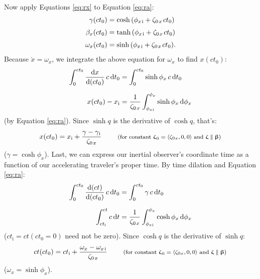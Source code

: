 \documentclass[12pt]{article}
\newcommand{\dd}[1]{\mathrm{d}#1}
\newcommand{\vvbeta}{\bm{\upbeta}}
\newcommand{\vvzeta}{\bm{\upzeta}}
\begin{document}
Now apply Equations \ref{eq:rx} to Equation \ref{eq:ra}:
\begin{equation*}
\begin{aligned}
\gamma (ct_0) &= \cosh{\left( \phi_{x \mkern2mu \textrm{i} } + \zeta_{0 \mkern2mu x} \mkern2mu ct_0 \right)} \\[3pt]
\beta_x (ct_0) &= \tanh{\left( \phi_{x \mkern2mu \textrm{i} } + \zeta_{0 \mkern2mu x} \mkern2mu ct_0 \right)} \\[3pt]
\omega_x (ct_0) &= \sinh{\left( \phi_{x \mkern2mu \textrm{i} } + \zeta_{0 \mkern2mu x} \mkern2mu ct_0 \right)} .
\end{aligned}
\end{equation*}
Because $\mathring{x} = \omega_x$, we integrate the above equation for $\omega_x$ to find $x(ct_0)$:
\begin{equation*}
\begin{split}
\int^{ct_0}_0 \dfrac{\dd x}{\dd (c t_0)} \, c \, \dd t_0 &= \int^{ct_0}_0 \sinh{\phi_x} \, c \, \dd t_0 \\[6pt]
x(ct_0) - x_{\mathrm{i}} &= \dfrac{1}{\zeta_{0 \mkern2mu x}} \int^{\phi_x}_{\phi_{x \mkern1mu \textrm{i} }} \sinh{\phi_x} \, \dd \phi_x
\end{split}
\end{equation*}
(by Equation \ref{eq:ra}). Since $\sinh{q}$ is the derivative of $\cosh{q}$, that's:
\begin{equation}\label{eq:x2}
x(ct_0) = x_{\mathrm{i}} + \dfrac{\gamma - \gamma_{\mkern1mu \mathrm{i}}}{ \zeta_{0 \mkern2mu x}} \qquad \textrm{\footnotesize{ (for constant $\vvzeta_{\mkern1mu 0} = \langle \zeta_{0 \mkern1mu x} , 0, 0 \rangle$ and $\vvzeta \parallel \vvbeta$)}}
\end{equation}
($\gamma = \cosh{\phi_x}$). Last, we can express our inertial observer's coordinate time as a function of our accelerating traveler's proper time. By time dilation and Equation \ref{eq:ra}:
\begin{equation*}
\begin{split}
\int^{ct_0}_0 \dfrac{\dd (ct)}{\dd (c t_0)} \, c \, \dd t_0 &= \int^{ct_0}_0 \gamma \, c \, \dd t_0 \\[6pt]
\int^{ct}_{ct_{\mathrm{i}}} c \, \dd t &= \dfrac{1}{ \zeta_{0 \mkern2mu x}} \int^{\phi_x}_{\phi_{x \mkern1mu \textrm{i} }} \cosh{\phi_x} \, \dd \phi_x
\end{split}
\end{equation*}
($ct_{\mathrm{i}} = ct (ct_0 = 0)$ need not be zero). Since $\cosh q$ is the derivative of $\sinh q$:
\begin{equation}\label{eq:ct}
ct(ct_0) = ct_{\mathrm{i}} + \dfrac{\omega_x - \omega_{x \mkern2mu \textrm{i} }}{ \zeta_{0 \mkern2mu x}} \qquad \textrm{\footnotesize{ (for constant $\vvzeta_{\mkern1mu 0} = \langle \zeta_{0 \mkern1mu x} , 0, 0 \rangle$ and $\vvzeta \parallel \vvbeta$)}}
\end{equation}
($\omega_x = \sinh{\phi_x}$).
\end{document}
